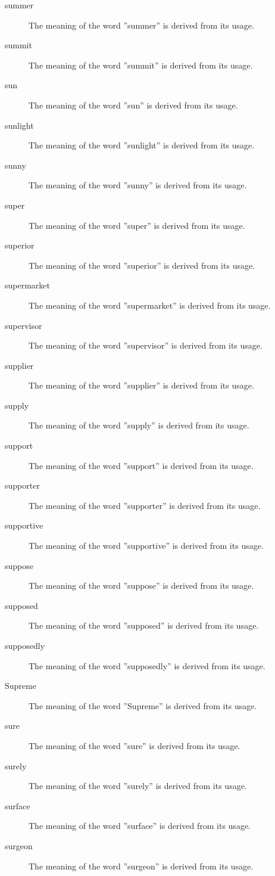 \documentclass[12pt, letterpaper]{memoir}
\begin{document}
\begin{description}
\item[summer] The meaning of the word ''summer'' is derived from its usage.
\item[summit] The meaning of the word ''summit'' is derived from its usage.
\item[sun] The meaning of the word ''sun'' is derived from its usage.
\item[sunlight] The meaning of the word ''sunlight'' is derived from its usage.
\item[sunny] The meaning of the word ''sunny'' is derived from its usage.
\item[super] The meaning of the word ''super'' is derived from its usage.
\item[superior] The meaning of the word ''superior'' is derived from its usage.
\item[supermarket] The meaning of the word ''supermarket'' is derived from its usage.
\item[supervisor] The meaning of the word ''supervisor'' is derived from its usage.
\item[supplier] The meaning of the word ''supplier'' is derived from its usage.
\item[supply] The meaning of the word ''supply'' is derived from its usage.
\item[support] The meaning of the word ''support'' is derived from its usage.
\item[supporter] The meaning of the word ''supporter'' is derived from its usage.
\item[supportive] The meaning of the word ''supportive'' is derived from its usage.
\item[suppose] The meaning of the word ''suppose'' is derived from its usage.
\item[supposed] The meaning of the word ''supposed'' is derived from its usage.
\item[supposedly] The meaning of the word ''supposedly'' is derived from its usage.
\item[Supreme] The meaning of the word ''Supreme'' is derived from its usage.
\item[sure] The meaning of the word ''sure'' is derived from its usage.
\item[surely] The meaning of the word ''surely'' is derived from its usage.
\item[surface] The meaning of the word ''surface'' is derived from its usage.
\item[surgeon] The meaning of the word ''surgeon'' is derived from its usage.

\end{description}
\end{document}
